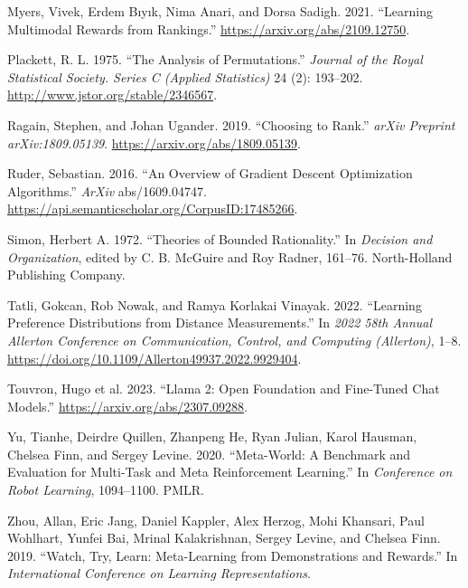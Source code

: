 \documentclass[
  letterpaper,
  numbers=noenddot,
  DIV=11]{scrreprt}
\newlength{\cslhangindent}
\newenvironment{CSLReferences}[2] %
 {\begin{list}{}{%
  \setlength{\itemindent}{0pt}
  \setlength{\leftmargin}{0pt}
  \setlength{\parsep}{0pt}
  \ifodd #1
   \setlength{\leftmargin}{\cslhangindent}
   \setlength{\itemindent}{-1\cslhangindent}
  \fi
  \setlength{\itemsep}{#2\baselineskip}}}
 {\end{list}}
\theoremstyle{definition}
\theoremstyle{plain}
\theoremstyle{plain}
\theoremstyle{remark}
\begin{document}
\begin{CSLReferences}{1}{0}
Myers, Vivek, Erdem Bıyık, Nima Anari, and Dorsa Sadigh. 2021.
{``Learning Multimodal Rewards from Rankings.''}
\url{https://arxiv.org/abs/2109.12750}.

Plackett, R. L. 1975. {``The Analysis of Permutations.''} \emph{Journal
of the Royal Statistical Society. Series C (Applied Statistics)} 24 (2):
193--202. \url{http://www.jstor.org/stable/2346567}.

Ragain, Stephen, and Johan Ugander. 2019. {``Choosing to Rank.''}
\emph{arXiv Preprint arXiv:1809.05139}.
\url{https://arxiv.org/abs/1809.05139}.

Ruder, Sebastian. 2016. {``An Overview of Gradient Descent Optimization
Algorithms.''} \emph{ArXiv} abs/1609.04747.
\url{https://api.semanticscholar.org/CorpusID:17485266}.

Simon, Herbert A. 1972. {``Theories of Bounded Rationality.''} In
\emph{Decision and Organization}, edited by C. B. McGuire and Roy
Radner, 161--76. North-Holland Publishing Company.

Tatli, Gokcan, Rob Nowak, and Ramya Korlakai Vinayak. 2022. {``Learning
Preference Distributions from Distance Measurements.''} In \emph{2022
58th Annual Allerton Conference on Communication, Control, and Computing
(Allerton)}, 1--8.
\url{https://doi.org/10.1109/Allerton49937.2022.9929404}.

Touvron, Hugo et al. 2023. {``Llama 2: Open Foundation and Fine-Tuned
Chat Models.''} \url{https://arxiv.org/abs/2307.09288}.

Yu, Tianhe, Deirdre Quillen, Zhanpeng He, Ryan Julian, Karol Hausman,
Chelsea Finn, and Sergey Levine. 2020. {``Meta-World: A Benchmark and
Evaluation for Multi-Task and Meta Reinforcement Learning.''} In
\emph{Conference on Robot Learning}, 1094--1100. PMLR.

Zhou, Allan, Eric Jang, Daniel Kappler, Alex Herzog, Mohi Khansari, Paul
Wohlhart, Yunfei Bai, Mrinal Kalakrishnan, Sergey Levine, and Chelsea
Finn. 2019. {``Watch, Try, Learn: Meta-Learning from Demonstrations and
Rewards.''} In \emph{International Conference on Learning
Representations}.

\end{CSLReferences}
\end{document}
